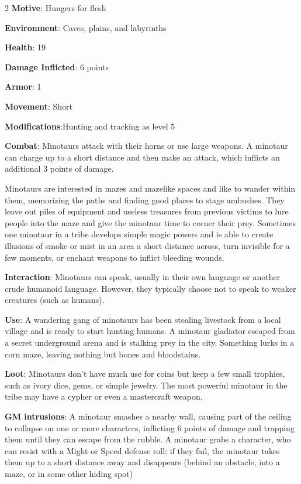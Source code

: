 \begin{multicols}{2}
\textbf{Motive}: Hungers for flesh 

\textbf{Environment}: Caves, plains, and labyrinths 

\textbf{Health}: 19 

\textbf{Damage Inflicted}: 6 points 

\textbf{Armor}: 1 

\textbf{Movement}: Short 

\textbf{Modifications}:Hunting and tracking as level 5 

\textbf{Combat}: Minotaurs attack with their horns or use large weapons. A minotaur can charge up to a short distance and then make an attack, which inflicts an additional 3 points of damage. 

Minotaurs are interested in mazes and mazelike spaces and like to wander within them, memorizing the paths and finding good places to stage ambushes. They leave out piles of equipment and useless treasures from previous victims to lure people into the maze and give the minotaur time to corner their prey. Sometimes one minotaur in a tribe develops simple magic powers and is able to create illusions of smoke or mist in an area a short distance across, turn invisible for a few moments, or enchant weapons to inflict bleeding wounds. 

\textbf{Interaction}: Minotaurs can speak, usually in their own language or another crude humanoid language. However, they typically choose not to speak to weaker creatures (such as humans). 

\textbf{Use}: A wandering gang of minotaurs has been stealing livestock from a local village and is ready to start hunting humans. A minotaur gladiator escaped from a secret underground arena and is stalking prey in the city. Something lurks in a corn maze, leaving nothing but bones and bloodstains. 

\textbf{Loot}: Minotaurs don’t have much use for coins but keep a few small trophies, such as ivory dice, gems, or simple jewelry. The most powerful minotaur in the tribe may have a cypher or even a mastercraft weapon.

\textbf{GM intrusions}: A minotaur smashes a nearby wall, causing part of the ceiling to collapse on one or more characters, inflicting 6 points of damage and trapping them until they can escape from the rubble. A minotaur grabs a character, who can resist with a Might or Speed defense roll; if they fail, the minotaur takes them up to a short distance away and disappears (behind an obstacle, into a maze, or in some other hiding spot)


\end{multicols}
